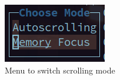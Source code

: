 \documentclass{report}
\begin{document}
\begin{figure}[H]
	\centering
	\begin{minipage}[t]{0.49\textwidth}
		\centering
		\begin{minipage}[b]{0.35\textwidth}
			\includegraphics[width=\textwidth]{./figures/menu.png}
		\end{minipage}
		\caption{Menu to switch scrolling mode}
    \label{fig:menu}
	\end{minipage}
	\begin{minipage}[t]{0.49\textwidth}
		\centering
		\begin{minipage}[b]{0.5\textwidth}

\end{minipage}
\end{minipage}
\end{figure}
\end{document}
